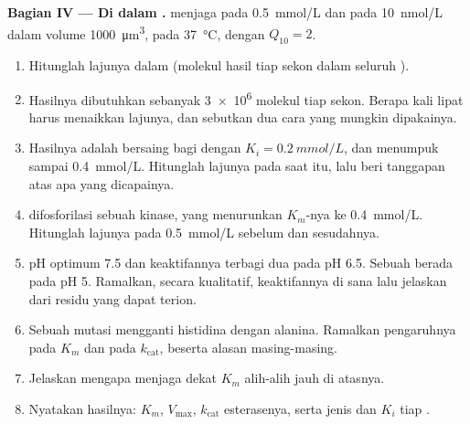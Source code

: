 \begin{problem}
\medskip
\noindent\textbf{Bagian IV --- Di dalam .}
 menjaga  pada \qty{0.5}{mmol/L} dan  pada
\qty{10}{nmol/L} dalam volume \qty{1000}{\micro m^3}, pada
\qty{37}{\celsius}, dengan $Q_{10} = 2$.
\begin{enumerate}[resume]
  \item Hitunglah lajunya dalam  (molekul hasil tiap sekon dalam
        seluruh ).
  \item Hasilnya dibutuhkan sebanyak \qty{3e6}{} molekul tiap sekon.
        Berapa kali lipat  harus menaikkan lajunya, dan sebutkan dua
        cara yang mungkin dipakainya.
  \item Hasilnya adalah  bersaing bagi  dengan
        $K_i = \qty{0.2}{mmol/L}$, dan menumpuk sampai
        \qty{0.4}{mmol/L}. Hitunglah lajunya pada saat itu, lalu beri
        tanggapan atas apa yang dicapainya.
  \item {} difosforilasi sebuah kinase, yang menurunkan $K_m$-nya
        ke \qty{0.4}{mmol/L}. Hitunglah lajunya pada 
        \qty{0.5}{mmol/L} sebelum dan sesudahnya.
  \item pH optimum  7.5 dan keaktifannya terbagi dua pada pH
        6.5. Sebuah  berada pada pH 5. Ramalkan, secara
        kualitatif, keaktifannya di sana lalu jelaskan dari residu yang
        dapat terion.
  \item Sebuah mutasi mengganti histidina  dengan alanina.
        Ramalkan pengaruhnya pada $K_m$ dan pada $k_{\text{cat}}$,
        beserta alasan masing-masing.
  \item Jelaskan mengapa  menjaga  dekat $K_m$ alih-alih
        jauh di atasnya.
  \item Nyatakan hasilnya: $K_m$, $V_{\max}$, $k_{\text{cat}}$
        esterasenya, serta jenis dan $K_i$ tiap .
\end{enumerate}
\end{problem}
